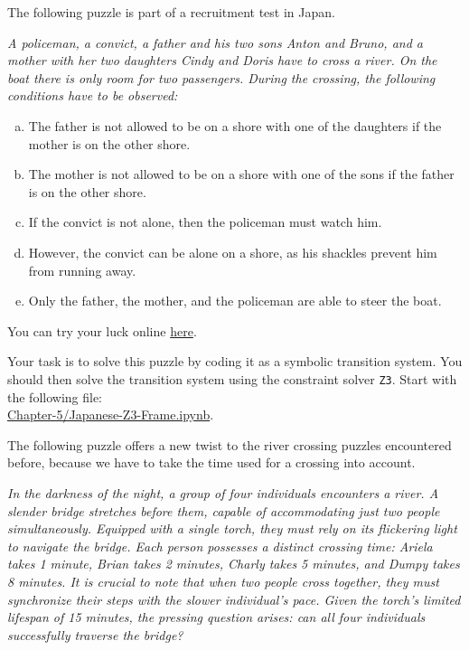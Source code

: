 \exerciseEng
The following puzzle is part of a recruitment test in Japan.

\begin{minipage}{0.95\linewidth}
{\sl
  A policeman, a convict, a father and his two sons Anton and Bruno, and a mother with her two daughters Cindy and Doris have to cross a river. On the boat there is only room for two passengers.
During the crossing, the following conditions have to be observed:
\begin{enumerate}[(a)]
\item The father is not allowed to be on a shore with one of the daughters if the mother is on the other shore.
\item The mother is not allowed to be on a shore with one of the sons if the father is on the other shore.
\item If the convict is not alone, then the policeman must watch him.
\item However, the convict can be alone on a shore, as his shackles prevent him from running away.
\item Only the father, the mother, and the policeman are able to steer the boat.
\end{enumerate}}
\end{minipage}
\vspace*{0.2cm}

\noindent
You can try your luck online \href{https://flashmuseum.org/iq-%E9%81%8E%E6%B2%B3%E9%81%8A%E6%88%B2/}{here}.

\noindent
Your task is to solve this puzzle by coding it as a symbolic transition system.  You should then solve the
transition system using the constraint solver \texttt{Z3}.
Start with the following file:
\\[0.2cm]
\hspace*{1.3cm}
\href{https://github.com/karlstroetmann/Logic/blob/master/Java/Chapter-5/Japanese-Z3-Frame.ipynb}{Chapter-5/Japanese-Z3-Frame.ipynb}.
\eox

\exerciseEng
The following puzzle offers a new twist to the river crossing puzzles encountered before, because we have to
take the time used for a crossing into account.

\begin{minipage}{0.95\linewidth}
  {\sl
    In the darkness of the night, a group of four individuals encounters a river. A slender bridge stretches
    before them, capable of accommodating just two people simultaneously. Equipped with a single torch, they
    must rely on its flickering light to navigate the bridge. Each person possesses a distinct crossing time:
    Ariela takes 1 minute, Brian takes 2 minutes, Charly takes 5 minutes, and Dumpy takes 8 minutes. It is
    crucial to note that when two people cross together, they must synchronize their steps with the slower
    individual's pace. Given the torch's limited lifespan of 15 minutes, the pressing question arises: can all
    four individuals successfully traverse the bridge? 
  }
\end{minipage}

